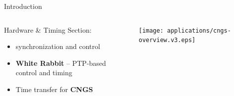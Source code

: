 \documentclass[compress,red]{beamer}
\begin{document}
\begin{frame}{Introduction}

\begin{columns}[c]

     \begin{block}{Hardware \& Timing Section:} 
	\begin{itemize}
	  \item synchronization and control
	  \item \textbf{White Rabbit} -- PTP-based control and timing 
	  \item Time transfer for \textbf{CNGS}
	\end{itemize}
     \end{block}

    \begin{center}
\pause
      \texttt{[image: applications/cngs-overview.v3.eps]}
    \end{center}
\end{columns}

\end{frame}
\end{document}
